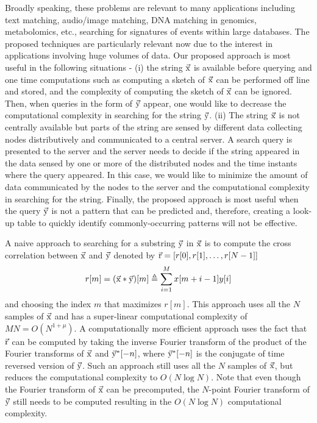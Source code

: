 Broadly speaking, these problems are relevant to many applications including text matching, audio/image matching, DNA matching in genomics, metabolomics, etc., searching for signatures of events within large databases. The proposed techniques are particularly relevant now due to the interest in applications involving huge volumes of data. Our proposed approach is most useful in the following situations - (i) the string $\vec{\mathrm{x}}$ is available before querying and one time computations such as computing a sketch of $\vec{\mathrm{x}}$ can be performed off line and stored, and the complexity of computing the sketch of $\vec{\mathrm{x}}$ can be ignored. Then, when queries in the form of $\vec{\mathrm{y}}$ appear, one would like to decrease the computational complexity in searching for the string $\vec{\mathrm{y}}$. (ii) The string $\vec{\mathrm{x}}$ is not centrally available but parts of the string are sensed by different data collecting nodes distributively and communicated to a central server. A search query is presented to the server and the server needs to decide if the string appeared in the data sensed by one or more of the distributed nodes and the time instants where the query appeared. In this case, we would like to minimize the amount of data communicated by the nodes to the server and the computational complexity in searching for the string. Finally, the proposed approach is most useful when the query $\vec{\mathrm{y}}$ is not a pattern that can be predicted and, therefore, creating a look-up table to quickly identify commonly-occurring patterns will not be effective.

A naive approach to searching for a substring $\vec{\mathrm{y}}$ in $\vec{\mathrm{x}}$ is to compute the cross correlation between $\vec{\mathrm{x}}$ and $\vec{\mathrm{y}}$ denoted by  $\vec{\mathrm{r}}=[r[0], r[1],\ldots, r[N-1]]$
\begin{align}
\label{Eqn:DefCrossCorrelation}
r[m]=(\vec{\mathrm{x}}*\vec{\mathrm{y}})[m] \triangleq \sum_{i=1}^{M} x[m+i-1] y[i]
\end{align}
and choosing the index $m$ that maximizes $r[m]$. This approach uses all the $N$ samples of $\vec{\mathrm{x}}$ and has a super-linear computational complexity of $MN = O(N^{1+\mu})$. A computationally more efficient approach uses the fact that $\vec{\mathrm{r}}$ can be computed by taking the inverse Fourier transform of the product of the Fourier transforms of $\vec{\mathrm{x}}$ and $ \vec{\mathrm{y}}^*[-n]$, where $\vec{\mathrm{y}}^*[-n]$ is the conjugate of time reversed version of $\vec{\mathrm{y}}$. Such an approach still uses all the $N$ samples of $\vec{\mathrm{x}}$, but reduces the computational complexity to $O(N \log N)$. Note that even though the Fourier transform of $\vec{\mathrm{x}}$ can be precomputed, the $N$-point Fourier transform of $\vec{\mathrm{y}}$ still needs to be computed resulting in the $O(N \log N)$ computational complexity.

